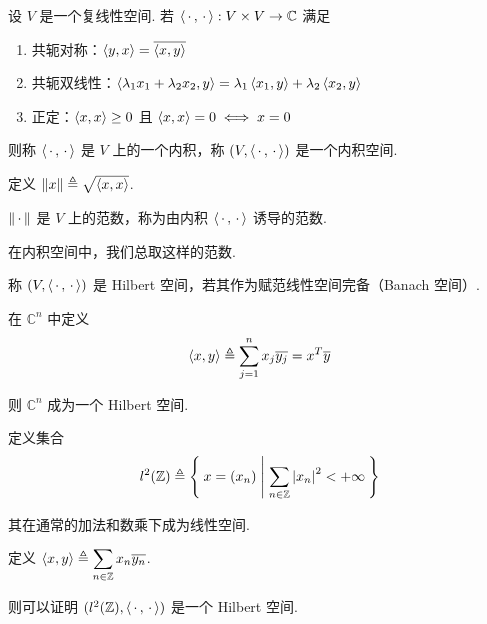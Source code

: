 

\begin{definition}
    设 $V$ 是一个复线性空间. 若 $\left\langle{\,\cdot\,,\,\cdot\,}\right\rangle:V\times V\to\mathbb{C}$ 满足

    \begin{enumerate}
        \item 共轭对称：$\left\langle{y,x}\right\rangle=\overline{\left\langle{x,y}\right\rangle}$
        
        \item 共轭双线性：$\left\langle{\lambda_1x_1+\lambda_2x_2,y}\right\rangle=\lambda_1\left\langle{x_1,y}\right\rangle+\lambda_2\left\langle{x_2,y}\right\rangle$
        
        \item 正定：$\left\langle{x,x}\right\rangle\ge 0$ 且 $\left\langle{x,x}\right\rangle=0\iff x=0$
    \end{enumerate}

    则称 $\left\langle{\,\cdot\,,\,\cdot\,}\right\rangle$ 是 $V$ 上的一个内积，称 $(V,\left\langle{\,\cdot\,,\,\cdot\,}\right\rangle)$ 是一个内积空间.

    定义 $\left\lVert{x}\right\rVert\triangleq\sqrt{\left\langle{x,x}\right\rangle}$.
\end{definition}

\begin{property}
    $\left\lVert{\,\cdot\,}\right\rVert$ 是 $V$ 上的范数，称为由内积 $\left\langle{\,\cdot\,,\,\cdot\,}\right\rangle$ 诱导的范数.

    在内积空间中，我们总取这样的范数.
\end{property}

\begin{definition}
    称 $(V,\left\langle{\,\cdot\,,\,\cdot\,}\right\rangle)$ 是 Hilbert 空间，若其作为赋范线性空间完备（Banach 空间）.
\end{definition}

\begin{example}
    在 $\mathbb{C}^n$ 中定义
$$
\left\langle{x,y}\right\rangle\triangleq\sum_{j=1}^nx_j\overline{y_j}=x^T\overline{y}
$$

    则 $\mathbb{C}^n$ 成为一个 Hilbert 空间.
\end{example}

\begin{example}
    定义集合
$$
l^2(\mathbb{Z})\triangleq\Set{x=(x_n)|\sum_{n\in\mathbb{Z}}\left\lvert{x_n}\right\rvert^2<+\infty}
$$

    其在通常的加法和数乘下成为线性空间.

    定义 $\left\langle{x,y}\right\rangle\triangleq\displaystyle\sum_{n\in\mathbb{Z}}x_n\overline{y_n}$.

    则可以证明 $(l^2(\mathbb{Z}),\left\langle{\,\cdot\,,\,\cdot\,}\right\rangle)$ 是一个 Hilbert 空间.
\end{example}

